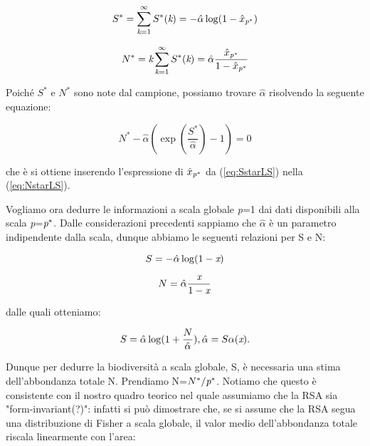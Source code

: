 \begin{equation}
S^*=\sum_{\emph{k}=1}^\infty S^*(\emph{k})=-\hat \alpha \log (1-\emph{$\hat x$}_{\emph{p}^*})
\label{eq:SstarLS}
\end{equation}

\begin{equation}
N^*=\emph{k}\sum_{\emph{k}=1}^\infty S^*(\emph{k})=\hat \alpha \frac{\emph{$\hat x$}_{\emph{p}^*}}{1-\emph{$\hat x$}_{\emph{p}^*}}
\label{eq:NstarLS}
\end{equation}

Poiché $S^*$ e $N^*$ sono note dal campione, possiamo trovare $\hat \alpha$ risolvendo la seguente equazione:

\begin{equation}
N^*- \hat \alpha(\exp( \frac{S^*}{\hat \alpha})-1)=0
\label{eq:solve}
\end{equation}

che è si ottiene inserendo l'espressione di $  \emph{$\hat x$}_{\emph{p}^*} $ da (\ref{eq:SstarLS}) nella (\ref{eq:NstarLS}).

Vogliamo ora dedurre le informazioni a scala globale \emph{p}=1 dai dati disponibili alla scala \emph{p}=$\emph{p}^*$. Dalle considerazioni precedenti sappiamo che $ \hat \alpha$ è un parametro indipendente dalla scala, dunque abbiamo le seguenti relazioni per S e N:

\begin{equation}
S=-\hat \alpha \log(1-\emph{x})
\label{eq:SLS}
\end{equation}

\begin{equation}
N=\hat \alpha \frac{\emph{x}}{1-\emph{x}}
\label{eq:NLS}
\end{equation}

dalle quali otteniamo:

\begin{equation}
S=\hat \alpha \log(1+ \frac{N}{\hat \alpha}),  \hat \alpha=S\alpha(\emph{x}).
\label{eq:SalphaLS}
\end{equation}

Dunque per dedurre la biodiversità a scala globale, S, è necessaria una stima dell'abbondanza totale N. Prendiamo N=$N^*/ \emph{p}^*$. Notiamo che questo è consistente con il nostro quadro teorico nel quale assumiamo che la RSA sia "form-invariant(?)": infatti si può dimostrare che, se si assume che la RSA segua una distribuzione di Fisher a scala globale, il valor medio dell'abbondanza totale riscala linearmente con l'area:

